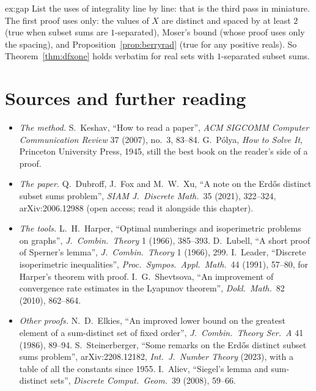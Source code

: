 \begin{solution}{ex:gap}
\idea List the uses of integrality line by line: that is the third pass in miniature.
\writeup The first proof uses only: the values of $X$ are distinct and spaced by at least $2$ (true when subset sums are $1$-separated), Moser's bound (whose proof
uses only the spacing), and Proposition~\ref{prop:berryrad} (true for any positive reals). So Theorem~\ref{thm:dfxone} holds verbatim for real sets with $1$-separated subset sums.
\end{solution}

\section*{Sources and further reading}

\begin{itemize}
\item \emph{The method.} S.~Keshav, ``How to read a paper'', \emph{ACM SIGCOMM Computer Communication Review} 37 (2007), no.~3, 83--84. G.~P\'olya, \emph{How to Solve It}, Princeton University
Press, 1945, still the best book on the reader's side of a proof.
\item \emph{The paper.} Q.~Dubroff, J.~Fox and M.~W.~Xu, ``A note on the Erd\H os distinct subset sums problem'', \emph{SIAM J.\ Discrete Math.}\ 35 (2021), 322--324, arXiv:2006.12988 (open
access; read it alongside this chapter).
\item \emph{The tools.} L.~H.~Harper, ``Optimal numberings and isoperimetric problems on graphs'', \emph{J.\ Combin.\ Theory} 1 (1966), 385--393. D.~Lubell, ``A short proof of Sperner's
lemma'', \emph{J.\ Combin.\ Theory} 1 (1966), 299. I.~Leader, ``Discrete isoperimetric inequalities'', \emph{Proc.\ Sympos.\ Appl.\ Math.}\ 44 (1991), 57--80, for Harper's theorem with proof.
I.~G.~Shevtsova, ``An improvement of convergence rate estimates in the Lyapunov theorem'', \emph{Dokl.\ Math.}\ 82 (2010), 862--864.
\item \emph{Other proofs.} N.~D.~Elkies, ``An improved lower bound on the greatest element of a sum-distinct set of fixed order'', \emph{J.\ Combin.\ Theory Ser.~A} 41 (1986), 89--94.
S.~Steinerberger, ``Some remarks on the Erd\H os distinct subset sums problem'', arXiv:2208.12182, \emph{Int.\ J.\ Number Theory} (2023), with a table of all the constants since 1955.
I.~Aliev, ``Siegel's lemma and sum-distinct sets'', \emph{Discrete Comput.\ Geom.}\ 39 (2008), 59--66.
\end{itemize}
